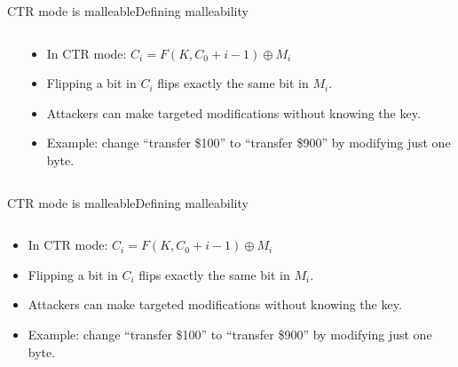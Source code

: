 \documentclass[aspectratio=169, lualatex, handout]{beamer}
\begin{document}
\begin{frame}{CTR mode is malleable}{Defining malleability}
	\begin{columns}[c]
		\begin{column}{0.5\textwidth}
		\end{column}
		\begin{column}{0.5\textwidth}
			\begin{itemize}[<+->]
				\item In CTR mode: $C_i = F(K, C_0 + i - 1) \oplus M_i$
				\item Flipping a bit in $C_i$ flips exactly the same bit in $M_i$.
				\item Attackers can make targeted modifications without knowing the key.
				\item Example: change ``transfer \$100'' to ``transfer \$900'' by modifying just one byte.
			\end{itemize}
		\end{column}
	\end{columns}
\end{frame}

\begin{frame}{CTR mode is malleable}{Defining malleability}
	\begin{columns}[c]
		\begin{column}{0.5\textwidth}
			\begin{itemize}
				\item In CTR mode: $C_i = F(K, C_0 + i - 1) \oplus M_i$
				\item Flipping a bit in $C_i$ flips exactly the same bit in $M_i$.
				\item Attackers can make targeted modifications without knowing the key.
				\item Example: change ``transfer \$100'' to ``transfer \$900'' by modifying just one byte.
			\end{itemize}
		\end{column}
		\begin{column}{0.5\textwidth}
		\end{column}
	\end{columns}
\end{frame}
\end{document}
